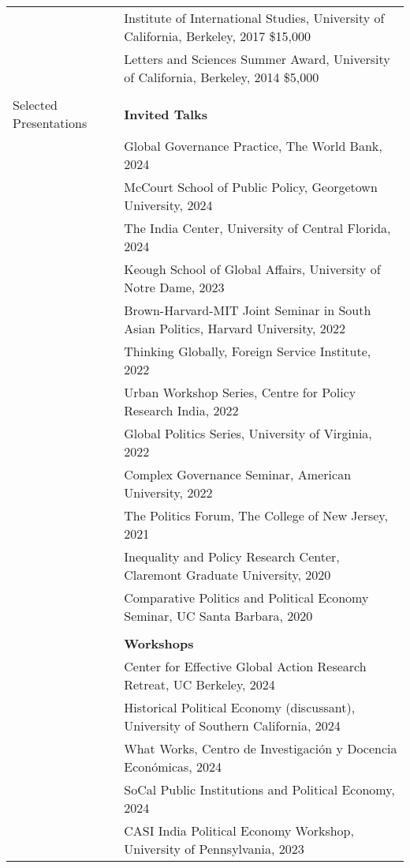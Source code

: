 \documentclass[letterpaper, 10.5pt]{article}
\begin{document}
\begin{longtable}{p{1.5in}p{5in}}
&Institute of International Studies, University of California, Berkeley, 2017 \hfill \$15,000  \\
& Letters and Sciences Summer Award, University of California, Berkeley, 2014 \hfill \$5,000\\
& \\





{{Selected Presentations}} & \textbf{Invited Talks}\\
&Global Governance Practice, The World Bank,  2024\\

&McCourt School of Public Policy, Georgetown University, 2024\\
& The India Center, University of Central Florida, 2024\\
&Keough School of Global Affairs, University of Notre Dame, 2023\\
 &Brown-Harvard-MIT Joint Seminar in South Asian Politics, Harvard University, 2022\\
  &Thinking Globally, Foreign Service Institute, 2022 \\
 &Urban Workshop Series, Centre for Policy Research India, 2022\\

 &Global Politics Series, University of Virginia, 2022\\
&Complex Governance Seminar, American University, 2022\\
&The Politics Forum, The College of New Jersey, 2021\\
 &Inequality and Policy Research Center, Claremont Graduate University, 2020\\
 & Comparative Politics and Political Economy Seminar, UC Santa Barbara, 2020\\
&\\
& \textbf{Workshops}\\ 
& Center for Effective Global Action Research Retreat, UC Berkeley, 2024\\
& Historical Political Economy (discussant), University of Southern California, 2024\\
&What Works, Centro de Investigaci\'{o}n y Docencia Econ\'{o}micas, 2024\\


& SoCal Public Institutions and Political Economy, 2024\\ & CASI India Political Economy Workshop, University of Pennsylvania, 2023\\     


\end{longtable}
\end{document}
